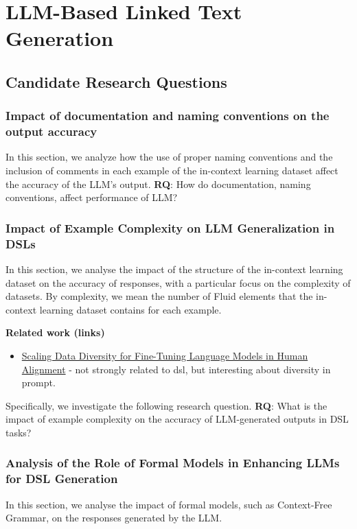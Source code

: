 \section{LLM-Based Linked Text Generation}

\subsection{Candidate Research Questions}

\subsubsection{Impact of documentation and naming conventions on the output accuracy}
In this section, we analyze how the use of proper naming conventions and the inclusion of comments in each example of the in-context learning dataset affect the accuracy of the LLM's output.
\textbf{RQ}: How do documentation, naming conventions, affect performance of LLM?

\subsubsection{Impact of Example Complexity on LLM Generalization in DSLs}
In this section, we analyse the impact of the structure of the in-context learning dataset on the accuracy of responses, with a particular focus on the complexity of datasets.
By complexity, we mean the number of Fluid elements that the in-context learning dataset contains for each example.

\textbf{Related work (links)}
\begin{itemize}
    \item \href{http://www.lrec-conf.org/proceedings/lrec-coling-2024/pdf/2024.main-1.1251.pdf}{Scaling Data Diversity for Fine-Tuning Language Models in Human Alignment} - not strongly related to dsl, but interesting about diversity in prompt.
\end{itemize}

Specifically, we investigate the following research question.
\textbf{RQ}: What is the impact of example complexity on the accuracy of LLM-generated outputs in DSL tasks?

\subsubsection{Analysis of the Role of Formal Models in Enhancing LLMs for DSL Generation}

In this section, we analyse the impact of formal models, such as Context-Free Grammar, on the responses generated by the LLM.

